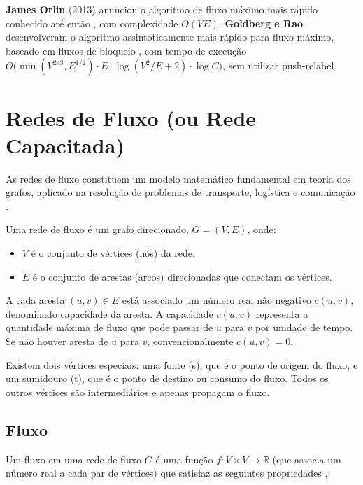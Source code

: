 \documentclass[12pt]{article}
\begin{document}
\textbf{James Orlin} (2013) anunciou o algoritmo de fluxo máximo mais rápido conhecido até então \cite{orlin2013}, com complexidade $O(VE)$. \textbf{Goldberg e Rao} desenvolveram o algoritmo assintoticamente mais rápido para fluxo máximo, baseado em fluxos de bloqueio \cite{goldberg1998}, com tempo de execução $O\big(\min(V^{2/3}, E^{1/2}) \cdot E \cdot \log(V^2/E + 2) \cdot \log C \big)$, sem utilizar push-relabel.



\newpage
\section{Redes de Fluxo  (ou Rede Capacitada)} 

As redes de fluxo constituem um modelo matemático fundamental em teoria dos grafos, aplicado na resolução de problemas de transporte, logística e comunicação \cite{ahuja1993,cormen2009}.

Uma rede de fluxo é um grafo direcionado, $G = (V, E)$, onde:

\begin{itemize}
    \item $V$ é o conjunto de vértices (nós) da rede.
    \item $E$ é o conjunto de arestas (arcos) direcionadas que conectam os vértices.
\end{itemize}

\noindent A cada aresta $(u, v) \in E$ está associado um número real não negativo $c(u, v)$, denominado capacidade da aresta. A capacidade $c(u, v)$ representa a quantidade máxima de fluxo que pode passar de $u$ para $v$ por unidade de tempo. Se não houver aresta de $u$ para $v$, convencionalmente $c(u, v) = 0$.

\noindent Existem dois vértices especiais: uma fonte (s), que é o ponto de origem do fluxo, e um sumidouro (t), que é o ponto de destino ou consumo do fluxo. Todos os outros vértices são intermediários e apenas propagam o fluxo.

\subsection{Fluxo} 

Um fluxo em uma rede de fluxo $G$ é uma função $f: V \times V \rightarrow \mathbb{R}$ (que associa um número real a cada par de vértices) que satisfaz as seguintes propriedades \cite{ahuja1993},:
\end{document}
